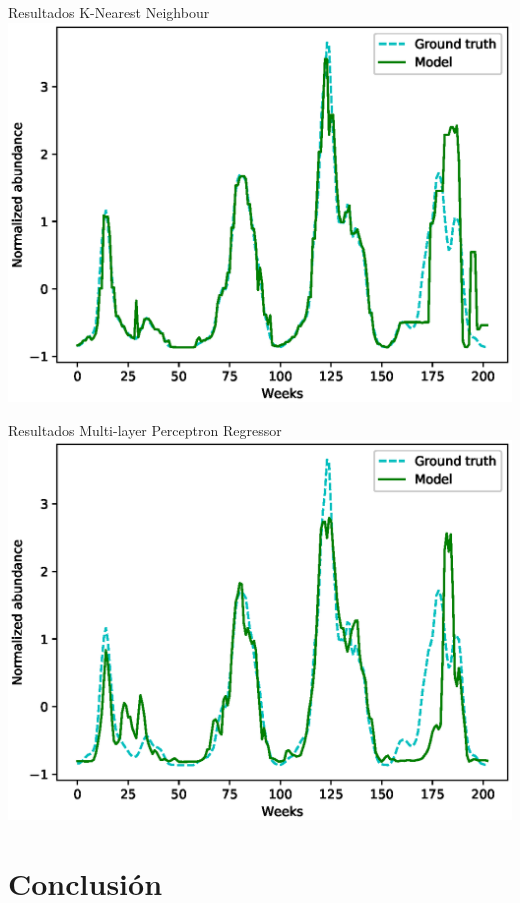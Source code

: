 \documentclass[10pt]{beamer}
\begin{document}
\begin{frame}{Resultados}
  \centering
  K-Nearest Neighbour
  \includegraphics[width=\textwidth]{knnr.eps}
\end{frame}

\begin{frame}{Resultados}
  \centering
  Multi-layer Perceptron Regressor
  \includegraphics[width=\textwidth]{mlpr.eps}
\end{frame}


\section{Conclusión}
\end{document}
